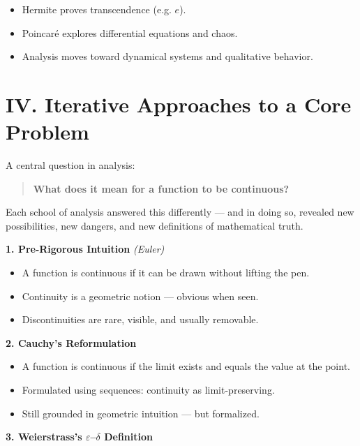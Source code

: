 \documentclass[9pt]{article}
\begin{document}
\begin{itemize}
  \item Hermite proves transcendence (e.g. $e$).
  \item Poincaré explores differential equations and chaos.
  \item Analysis moves toward dynamical systems and qualitative behavior.
\end{itemize}

\newpage

\section*{IV. Iterative Approaches to a Core Problem}

A central question in analysis:

\begin{quote}
\textbf{What does it mean for a function to be continuous?}
\end{quote}

\noindent
Each school of analysis answered this differently — and in doing so, revealed new possibilities, new dangers, and new definitions of mathematical truth.

\bigskip

\textbf{1. Pre-Rigorous Intuition} \hfill \textit{(Euler)}

\begin{itemize}
  \item A function is continuous if it can be drawn without lifting the pen.
  \item Continuity is a geometric notion — obvious when seen.
  \item Discontinuities are rare, visible, and usually removable.
\end{itemize}

\bigskip

\textbf{2. Cauchy’s Reformulation}

\begin{itemize}
  \item A function is continuous if the limit exists and equals the value at the point.
  \item Formulated using sequences: continuity as limit-preserving.
  \item Still grounded in geometric intuition — but formalized.
\end{itemize}

\bigskip

\textbf{3. Weierstrass’s $\varepsilon$–$\delta$ Definition}
\end{document}
